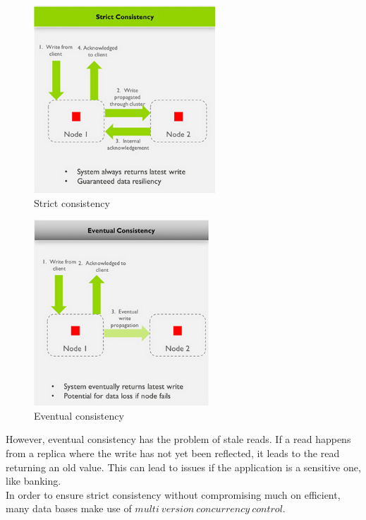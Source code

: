 \documentclass{article}
\begin{document}
    \begin{figure}[h!]
        \begin{center}
        \includegraphics[resolution=125]{strict_consistency.png}
        \end{center}
        \caption{Strict consistency}
    \end{figure}

    \begin{figure}[h!]
        \begin{center}
        \includegraphics[resolution=125]{eventual_consistency.png}
        \end{center}
        \caption{Eventual consistency}
    \end{figure}

    However, eventual consistency has the problem of stale reads. If a read happens from a replica where the write has not yet been reflected, it leads to the read returning an old value. This can lead to issues if the application is a sensitive one, like banking. \\

    In order to ensure strict consistency without compromising much on efficient, many data bases make use of $multi\ version\ concurrency\ control$. 
\end{document}
